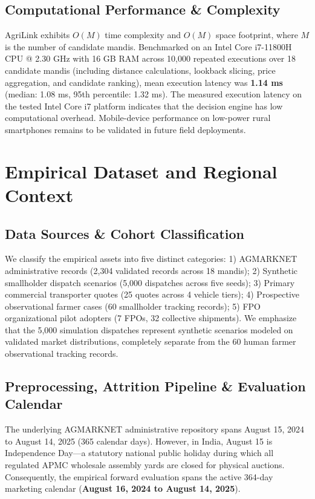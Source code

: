 \documentclass[journal]{IEEEtran}
\begin{document}
\subsection{Computational Performance \& Complexity}
AgriLink exhibits $O(M)$ time complexity and $O(M)$ space footprint, where $M$ is the number of candidate mandis. Benchmarked on an Intel Core i7-11800H CPU @ 2.30 GHz with 16 GB RAM across 10,000 repeated executions over 18 candidate mandis (including distance calculations, lookback slicing, price aggregation, and candidate ranking), mean execution latency was \textbf{1.14 ms} (median: 1.08 ms, 95th percentile: 1.32 ms). The measured execution latency on the tested Intel Core i7 platform indicates that the decision engine has low computational overhead. Mobile-device performance on low-power rural smartphones remains to be validated in future field deployments.

\section{Empirical Dataset and Regional Context}
\subsection{Data Sources \& Cohort Classification}
We classify the empirical assets into five distinct categories: 1) AGMARKNET administrative records (2,304 validated records across 18 mandis); 2) Synthetic smallholder dispatch scenarios (5,000 dispatches across five seeds); 3) Primary commercial transporter quotes (25 quotes across 4 vehicle tiers); 4) Prospective observational farmer cases (60 smallholder tracking records); 5) FPO organizational pilot adopters (7 FPOs, 32 collective shipments). We emphasize that the 5,000 simulation dispatches represent synthetic scenarios modeled on validated market distributions, completely separate from the 60 human farmer observational tracking records.

\subsection{Preprocessing, Attrition Pipeline \& Evaluation Calendar}
The underlying AGMARKNET administrative repository spans August 15, 2024 to August 14, 2025 (365 calendar days). However, in India, August 15 is Independence Day—a statutory national public holiday during which all regulated APMC wholesale assembly yards are closed for physical auctions. Consequently, the empirical forward evaluation spans the active 364-day marketing calendar (\textbf{August 16, 2024 to August 14, 2025}).
\end{document}
